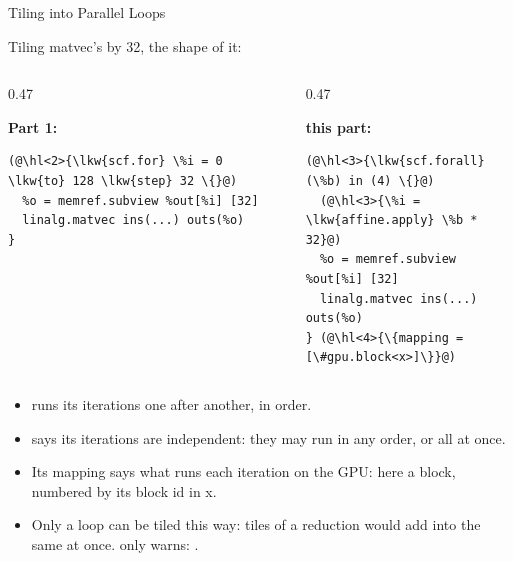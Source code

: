 \documentclass[aspectratio=169,10pt]{beamer}
\begin{document}
\begin{frame}[fragile]{Tiling into Parallel Loops}
  \begin{center}
    Tiling matvec's  by 32, the shape of it:
  \end{center}
  \begin{columns}[t]
    \begin{column}{0.47\textwidth}
      \begin{center}\small\textbf{Part 1: }\end{center}
\begin{lstlisting}[language=mlir]
(@\hl<2>{\lkw{scf.for} \%i = 0 \lkw{to} 128 \lkw{step} 32 \{}@)
  %o = memref.subview %out[%i] [32]
  linalg.matvec ins(...) outs(%o)
}
\end{lstlisting}
    \end{column}
    \begin{column}{0.47\textwidth}
      \begin{center}\small\textbf{this part: }\end{center}
\begin{lstlisting}[language=mlir]
(@\hl<3>{\lkw{scf.forall} (\%b) in (4) \{}@)
  (@\hl<3>{\%i = \lkw{affine.apply} \%b * 32}@)
  %o = memref.subview %out[%i] [32]
  linalg.matvec ins(...) outs(%o)
} (@\hl<4>{\{mapping = [\#gpu.block<x>]\}}@)
\end{lstlisting}
    \end{column}
  \end{columns}
  \vspace{0.6em}
  \begin{itemize}
    \item<2->  runs its iterations one after another, in order.
    \item<3->  says its iterations are independent: they may
      run in any order, or all at once.
    \item<4-> Its \alert{mapping} says what runs each iteration on the GPU:
      here a block, numbered by its block id in x.
    \item<5-> Only a  loop can be tiled this way: tiles of a
      reduction would add into the same  at once.
       only warns: .
  \end{itemize}
\end{frame}
\end{document}
